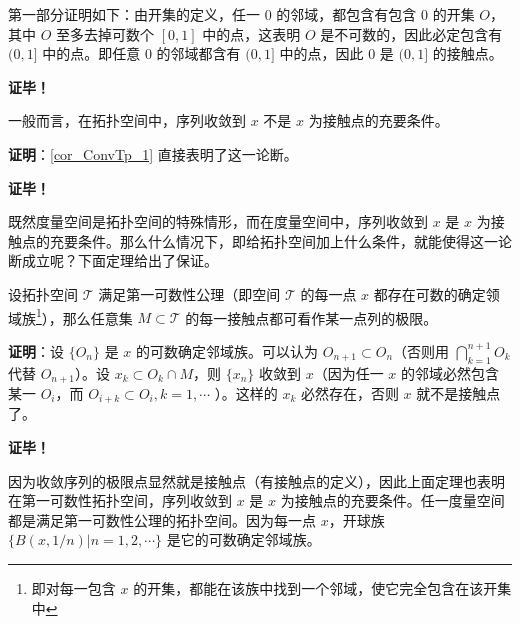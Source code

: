 第一部分证明如下：由开集的定义，任一 $0$ 的邻域，都包含有包含 $0$ 的开集 $O$，其中 $O$ 至多去掉可数个 $[0,1]$ 中的点，这表明 $O$ 是不可数的，因此必定包含有 $(0,1]$ 中的点。即任意 $0$ 的邻域都含有 $(0,1]$ 中的点，因此 $0$ 是 $(0,1]$ 的接触点。 

\textbf{证毕！}


 \begin{theorem}{}
 一般而言，在拓扑空间中，序列收敛到 $x$ 不是 $x$ 为接触点的充要条件。
 \end{theorem}
 \textbf{证明}：\autoref{cor_ConvTp_1} 直接表明了这一论断。

 \textbf{证毕！}

既然度量空间是拓扑空间的特殊情形，而在度量空间中，序列收敛到 $x$ 是 $x$ 为接触点的充要条件。那么什么情况下，即给拓扑空间加上什么条件，就能使得这一论断成立呢？下面定理给出了保证。


\begin{theorem}{}
设拓扑空间 $\mathcal T$ 满足第一可数性公理（即空间 $\mathcal T$ 的每一点 $x$ 都存在可数的确定领域族\footnote{即对每一包含 $x$ 的开集，都能在该族中找到一个邻域，使它完全包含在该开集中}），那么任意集 $M\subset\mathcal T$ 的每一接触点都可看作某一点列的极限。
\end{theorem}

 \textbf{证明}：设 $\{O_n\}$ 是 $x$ 的可数确定邻域族。可以认为 $O_{n+1}\subset O_n$（否则用 $\bigcap_{k=1}^{n+1} O_{k}$ 代替 $O_{n+1}$）。设 $x_k\subset O_k\cap M$，则 $\{x_n\}$ 收敛到 $x$（因为任一 $x$ 的邻域必然包含某一 $O_i$，而 $O_{i+k}\subset O_{i},k=1,\cdots$ ）。这样的 $x_k$ 必然存在，否则 $x$ 就不是接触点了。 

 
 \textbf{证毕！}

因为收敛序列的极限点显然就是接触点（有接触点的定义），因此上面定理也表明在第一可数性拓扑空间，序列收敛到 $x$ 是 $x$ 为接触点的充要条件。任一度量空间都是满足第一可数性公理的拓扑空间。因为每一点 $x$，开球族 $\{B(x,1/n)|n=1,2,\cdots\}$ 是它的可数确定邻域族。




